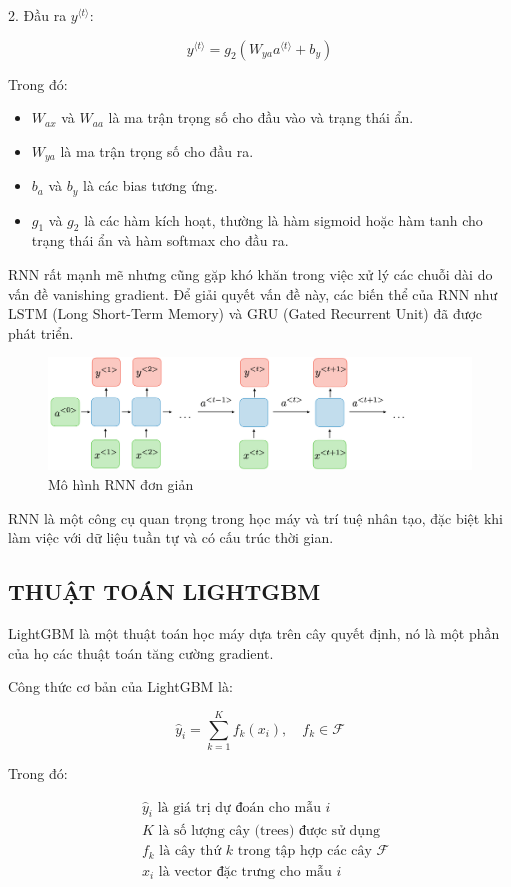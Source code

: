 \documentclass{article}
\begin{document}
\begin{multicols}{2}
2. Đầu ra \(y^{\langle t \rangle}\):

\[
y^{\langle t \rangle} = g_2 \left( W_{ya} a^{\langle t \rangle} + b_y \right)
\]

Trong đó:
\begin{itemize}
    \item \(W_{ax}\) và \(W_{aa}\) là ma trận trọng số cho đầu vào và trạng thái ẩn.
    \item \(W_{ya}\) là ma trận trọng số cho đầu ra.
    \item \(b_a\) và \(b_y\) là các bias tương ứng.
    \item \(g_1\) và \(g_2\) là các hàm kích hoạt, thường là hàm sigmoid hoặc hàm tanh cho trạng thái ẩn và hàm softmax cho đầu ra.
\end{itemize}

RNN rất mạnh mẽ nhưng cũng gặp khó khăn trong việc xử lý các chuỗi dài do vấn đề vanishing gradient. Để giải quyết vấn đề này, các biến thể của RNN như LSTM (Long Short-Term Memory) và GRU (Gated Recurrent Unit) đã được phát triển.

\begin{figure}
    \centering
    \includegraphics[width=0.5\linewidth]{image.png}
    \caption{Mô hình RNN đơn giản}
    \label{fig:rnn}
\end{figure}

RNN là một công cụ quan trọng trong học máy và trí tuệ nhân tạo, đặc biệt khi làm việc với dữ liệu tuần tự và có cấu trúc thời gian.


\subsection{THUẬT TOÁN LIGHTGBM}

LightGBM là một thuật toán học máy dựa trên cây quyết định, nó là một phần của họ các thuật toán tăng cường gradient.

Công thức cơ bản của LightGBM là:

\[
\hat{y}_i = \sum_{k=1}^{K} f_k(x_i), \quad f_k \in \mathcal{F}
\]

Trong đó:

\begin{align*}
&\hat{y}_i \text{ là giá trị dự đoán cho mẫu } i \\
&K \text{ là số lượng cây (trees) được sử dụng} \\
&f_k \text{ là cây thứ } k \text{ trong tập hợp các cây } \mathcal{F} \\
&x_i \text{ là vector đặc trưng cho mẫu } i
\end{align*}


\end{multicols}
\end{document}
